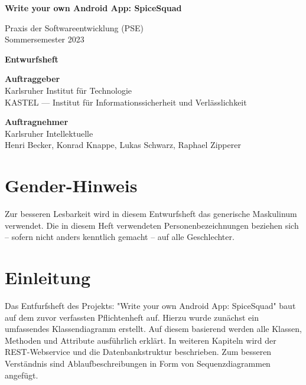 \documentclass[parskip=full]{scrartcl}
\begin{document}


\begin{titlepage}
    \begin{center}
        \begin{Huge}
            {\textbf{Write your own Android App: SpiceSquad}}
        \end{Huge}
        \vspace{12px}

        Praxis der Softwareentwicklung (PSE)\\
        Sommersemester 2023\\
        \vspace{150px}

        \begin{Huge}
            {\textbf{Entwurfsheft}}
        \end{Huge}
        \vspace{12px}

        \textbf{Auftraggeber}\\
        Karlsruher Institut für Technologie\\
        KASTEL — Institut für Informationssicherheit und Verlässlichkeit\\
        \vspace{330px}

        \textbf{Auftragnehmer}\\
        Karlsruher Intellektuelle\\
        Henri Becker, Konrad Knappe, Lukas Schwarz, Raphael Zipperer\\
    \end{center}
\end{titlepage}

\tableofcontents
\newpage

\section*{Gender-Hinweis}
Zur besseren Lesbarkeit wird in diesem Entwurfsheft das generische Maskulinum verwendet.
Die in diesem Heft verwendeten Personenbezeichnungen beziehen sich – sofern nicht anders kenntlich gemacht – auf alle Geschlechter.
\newpage

\section{Einleitung}
Das Entfurfsheft des Projekts: "Write your own Android App: SpiceSquad" baut auf dem zuvor verfassten Pflichtenheft auf.
Hierzu wurde zunächst ein umfassendes Klassendiagramm erstellt. Auf diesem basierend werden alle Klassen, Methoden und Attribute ausführlich erklärt.
In weiteren Kapiteln wird der REST-Webservice und die Datenbankstruktur beschrieben. Zum besseren Verständnis sind Ablaufbeschreibungen in Form von Sequenzdiagrammen angefügt.
\end{document}
